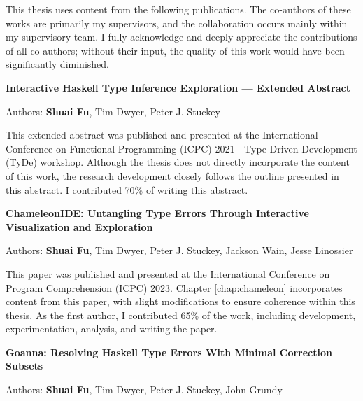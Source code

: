 \documentclass[
11pt, %
english, %
singlespacing, %
headsepline, %
]{MastersDoctoralThesis} %
\begin{document}
\begin{publications}

This thesis uses content from the following publications. The co-authors of these works are primarily my supervisors, and the collaboration occurs mainly within my supervisory team. I fully acknowledge and deeply appreciate the contributions of all co-authors; without their input, the quality of this work would have been significantly diminished.




\vspace{20px}

\noindent
\textbf{Interactive Haskell Type Inference Exploration --- Extended Abstract}

\noindent
Authors: \textbf{Shuai Fu}, Tim Dwyer, Peter J. Stuckey
\vspace{10px}

This extended abstract was published and presented at the International Conference on Functional Programming (ICPC) 2021 - Type Driven Development (TyDe) workshop.  Although the thesis does not directly incorporate the content of this work, the research development closely follows the outline presented in this abstract.  I contributed 70\% of writing this abstract.
 
\vspace{30px}

\noindent
\textbf{ChameleonIDE: Untangling Type Errors Through Interactive Visualization and Exploration}

\noindent
Authors: \textbf{Shuai Fu}, Tim Dwyer, Peter J. Stuckey, Jackson Wain, Jesse Linossier
\vspace{10px}

This paper was published and presented at the International Conference on Program Comprehension (ICPC) 2023. Chapter \ref{chap:chameleon} incorporates content from this paper, with slight modifications to ensure coherence within this thesis. As the first author, I contributed 65\% of the work, including development, experimentation, analysis, and writing the paper.
 

\vspace{30px}

\noindent
\textbf{Goanna: Resolving Haskell Type Errors With Minimal Correction Subsets}

\noindent
Authors: \textbf{Shuai Fu}, Tim Dwyer, Peter J. Stuckey, John Grundy
\vspace{10px}


\end{publications}
\end{document}
